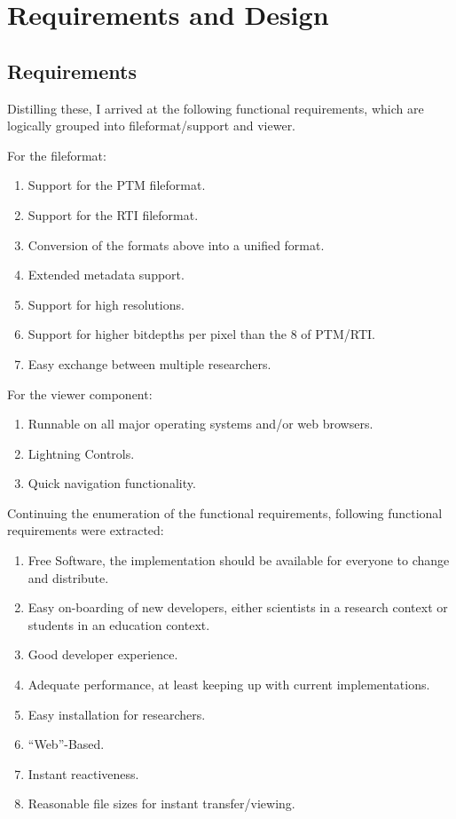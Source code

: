 \section{Requirements and Design}
\subsection{Requirements}
Distilling these, I arrived at the following functional requirements, which are
logically grouped into fileformat/support and viewer.

For the fileformat:
\begin{enumerate}
\item Support for the PTM\cite*{library_of_congress_polynomial_2018}  fileformat.
\item Support for the RTI\cite*{library_of_congress_reflectance_2018} fileformat.
\item Conversion of the formats above into a unified format.
\item Extended metadata support.
\item Support for high resolutions.
\item Support for higher bitdepths per pixel than the 8 of PTM/RTI.
\item Easy exchange between multiple researchers.
\end{enumerate}

For the viewer component:
\begin{enumerate}[resume]
\item Runnable on all major operating systems and/or web browsers.\label{req_system}
\item Lightning Controls.
\item Quick navigation functionality.
\end{enumerate}

Continuing the enumeration of the functional requirements, following functional
requirements were extracted:
\begin{enumerate}[resume]
\item  Free Software, the implementation should be available for everyone to
  change and distribute. \label{req_os}
\item Easy on-boarding of new developers, either scientists in a research context
  or students in an education context. \label{req_easy}
\item Good developer experience. \label{req_dx}
\item Adequate performance, at least keeping up with current
  implementations. \label{req_performance}
\item Easy installation for
  researchers. \label{req_install}
\item ``Web''-Based.
\item Instant reactiveness. \label{req_react}
\item Reasonable file sizes for instant transfer/viewing.
\end{enumerate}


